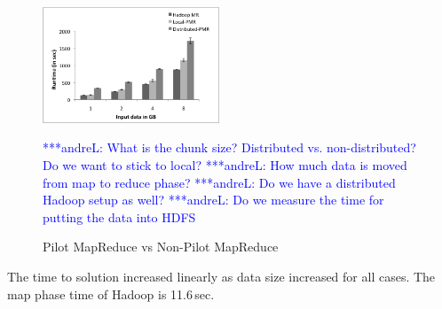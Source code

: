 \documentclass{acm_proc_article-sp}
\newcommand{\alnote}[1]{ {\textcolor{blue} { ***andreL: #1 }}}
\newcommand{\pnote}[1]{ {\textcolor{magenta} { ***pradeep: #1 }}}
\newcommand{\alnote}[1]{}
\newcommand{\pnote}[1]{}
\begin{document}
\begin{figure}[compMR]
	\centering
		\includegraphics[width=0.47\textwidth]{figures/HMRvsL-PMRvsD-PMR.png}
	\caption{Pilot MapReduce vs Non-Pilot MapReduce}
	\alnote{What is the chunk size? Distributed vs. non-distributed? Do we want to stick to local?}
	\alnote{How much data is moved from map to reduce phase?}
	\alnote{Do we have a distributed Hadoop setup as well?}
	\alnote{Do we measure the time for putting the data into HDFS}	
	\label{fig:figures_compMR}
\end{figure}

The time to solution increased linearly as data size increased for all cases. 
The map phase time of Hadoop is 11.6\,sec.

\end{document}
